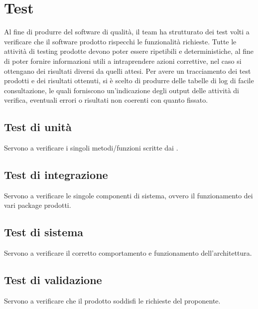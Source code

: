 \newpage
\section{Test}
Al fine di produrre del software di qualità, il team ha strutturato dei test volti a verificare che il software prodotto rispecchi le funzionalità richieste.
Tutte le attività di testing prodotte devono poter essere ripetibili e deterministiche, al fine di poter fornire informazioni utili a intraprendere azioni correttive, nel caso si ottengano dei risultati diversi da quelli attesi.
Per avere un tracciamento dei test prodotti e dei risultati ottenuti, si è scelto di produrre delle tabelle di log di facile consultazione, le quali forniscono un'indicazione degli output delle attività di verifica, eventuali errori o risultati non coerenti con quanto fissato.

	\subsection{Test di unità}
	Servono a verificare i singoli metodi/funzioni scritte dai \textit{\Progrs}.
	
	\subsection{Test di integrazione}
	Servono a verificare le singole componenti di sistema, ovvero il funzionamento dei vari package prodotti.
	
	\subsection{Test di sistema}
	Servono a verificare il corretto comportamento e funzionamento dell’architettura.
	
	\subsection{Test di validazione}
	Servono a verificare che il prodotto soddisfi le richieste del proponente.